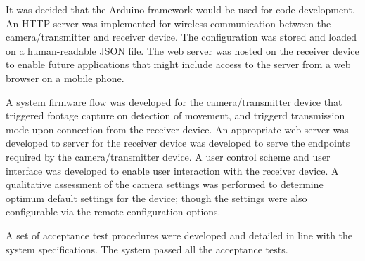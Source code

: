 \documentclass[class=report,11pt,crop=false]{standalone}
\begin{document}
It was decided that the Arduino framework would be used for code development. An HTTP server was implemented for wireless communication between the camera/transmitter and receiver device. The configuration was stored and loaded on a human-readable JSON file. The web server was hosted on the receiver device to enable future applications that might include access to the server from a web browser on a mobile phone.

A system firmware flow was developed for the camera/transmitter device that triggered footage capture on detection of movement, and triggerd transmission mode upon connection from the receiver device. An appropriate web server was developed to server for the receiver device was developed to serve the endpoints required by the camera/transmitter device. A user control scheme and user interface was developed to enable user interaction with the receiver device. A qualitative assessment of the camera settings was performed to determine optimum default settings for the device; though the settings were also configurable via the remote configuration options.

A set of acceptance test procedures were developed and detailed in line with the system specifications. The system passed all the acceptance tests. 


\ifstandalone

\printnoidxglossary[type=\acronymtype,nonumberlist]
\fi
\end{document}
